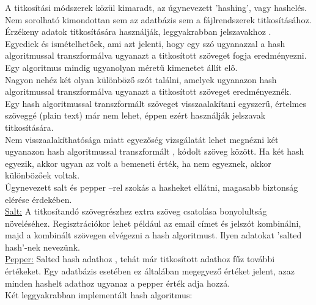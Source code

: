 A titkosítási módszerek közül kimaradt, az úgynevezett 'hashing', vagy hashelés. Nem sorolható kimondottan sem az adatbázis sem a fájlrendszerek titkosításához. 
\vspace{5pt} \\Érzékeny adatok titkosítására használják, leggyakrabban jelszavakhoz \cite{dang2008recommendation}.
\vspace{5pt} \\Egyediek és ismételhetőek, ami azt jelenti, hogy egy szó ugyanazzal a hash algoritmussal transzformálva ugyanazt a titkosított szöveget fogja eredményezni. 
\vspace{5pt} \\Egy algoritmus mindig ugyanolyan méretű kimenetet állít elő. 
\vspace{5pt} \\Nagyon nehéz két olyan különböző szót találni, amelyek ugyanazon hash algoritmussal transzformálva ugyanazt a titkosított szöveget eredményeznék.
\vspace{5pt} \\Egy hash algoritmussal transzformált szöveget visszaalakítani egyszerű, értelmes szöveggé (plain text) már nem lehet, éppen ezért használják jelszavak titkosítására.
\vspace{5pt} \\Nem visszaalakíthatósága miatt egyezőség vizsgálatát lehet megnézni két ugyanazon hash algoritmussal transzformált , kódolt szöveg között. Ha két hash egyezik, akkor ugyan az volt a bemeneti érték, ha nem egyeznek, akkor különbözőek voltak.
\vspace{5pt} \\Úgynevezett salt és pepper –rel szokás a hasheket ellátni, magasabb biztonság elérése érdekében.
\vspace{5pt} \\ \underline{Salt:} A titkosítandó szövegrészhez extra szöveg csatolása bonyolultság növeléséhez. Regisztrációkor lehet például az email címet és jelszót kombinálni, majd a kombinált szövegen elvégezni a hash algoritmust. Ilyen adatokat 'salted hash'-nek nevezünk.
\vspace{5pt} \\ \underline{Pepper:} Salted hash adathoz , tehát már titkosított adathoz fűz további értékeket. Egy adatbázis esetében ez általában megegyező értéket jelent, azaz minden hashelt adathoz ugyanaz a pepper érték adja hozzá.
\vspace{25pt} \\ Két leggyakrabban implementált hash algoritmus:

